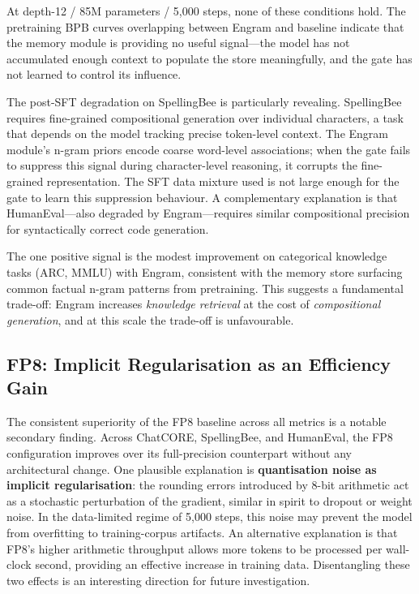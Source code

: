 At depth-12 / 85M parameters / 5{,}000 steps, none of these conditions hold.
The pretraining BPB curves overlapping between Engram and baseline indicate that the memory
module is providing no useful signal---the model has not accumulated enough context to populate
the store meaningfully, and the gate has not learned to control its influence.

The post-SFT degradation on SpellingBee is particularly revealing.
SpellingBee requires fine-grained compositional generation over individual characters, a task
that depends on the model tracking precise token-level context.
The Engram module's n-gram priors encode coarse word-level associations; when the gate fails to
suppress this signal during character-level reasoning, it corrupts the fine-grained representation.
The SFT data mixture used is not large enough for the gate to learn this suppression behaviour.
A complementary explanation is that HumanEval---also degraded by Engram---requires similar
compositional precision for syntactically correct code generation.

The one positive signal is the modest improvement on categorical knowledge tasks (ARC, MMLU)
with Engram, consistent with the memory store surfacing common factual n-gram patterns from
pretraining.
This suggests a fundamental trade-off: Engram increases \emph{knowledge retrieval} at the cost
of \emph{compositional generation}, and at this scale the trade-off is unfavourable.

\subsection{FP8: Implicit Regularisation as an Efficiency Gain}

The consistent superiority of the FP8 baseline across all metrics is a notable secondary finding.
Across ChatCORE, SpellingBee, and HumanEval, the FP8 configuration improves over its
full-precision counterpart without any architectural change.
One plausible explanation is \textbf{quantisation noise as implicit regularisation}: the rounding
errors introduced by 8-bit arithmetic act as a stochastic perturbation of the gradient, similar
in spirit to dropout or weight noise.
In the data-limited regime of 5{,}000 steps, this noise may prevent the model from overfitting
to training-corpus artifacts.
An alternative explanation is that FP8's higher arithmetic throughput allows more tokens to be
processed per wall-clock second, providing an effective increase in training data.
Disentangling these two effects is an interesting direction for future investigation.

